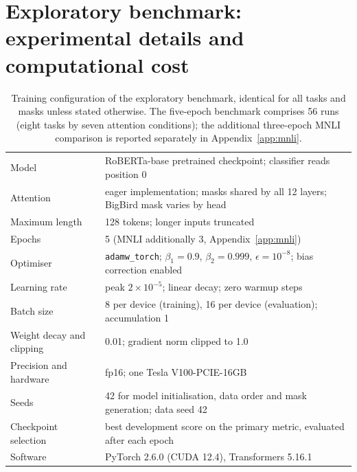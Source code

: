 \documentclass[10pt]{article}
\begin{document}
\section{Exploratory benchmark: experimental details and computational cost}
\label{app:details}

\begin{table}[H]
\centering
\caption{Training configuration of the exploratory benchmark, identical for all tasks and masks unless stated otherwise. The five-epoch benchmark comprises 56 runs (eight tasks by seven attention conditions); the additional three-epoch MNLI comparison is reported separately in Appendix~\ref{app:mnli}.}
\label{tab:hparams}
\small
\begin{tabular}{ll}
\toprule
Model & RoBERTa-base pretrained checkpoint; classifier reads position 0 \\
Attention & eager implementation; masks shared by all 12 layers; BigBird mask varies by head \\
Maximum length & 128 tokens; longer inputs truncated \\
Epochs & 5 (MNLI additionally 3, Appendix~\ref{app:mnli}) \\
Optimiser & \texttt{adamw\_torch}; $\beta_1=0.9$, $\beta_2=0.999$, $\epsilon=10^{-8}$; bias correction enabled \\
Learning rate & peak $2\times10^{-5}$; linear decay; zero warmup steps \\
Batch size & 8 per device (training), 16 per device (evaluation); accumulation 1 \\
Weight decay and clipping & 0.01; gradient norm clipped to 1.0 \\
Precision and hardware & fp16; one Tesla V100-PCIE-16GB \\
Seeds & 42 for model initialisation, data order and mask generation; data seed 42 \\
Checkpoint selection & best development score on the primary metric, evaluated after each epoch \\
Software & PyTorch 2.6.0 (CUDA 12.4), Transformers 5.16.1 \\
\bottomrule
\end{tabular}
\end{table}
\end{document}
